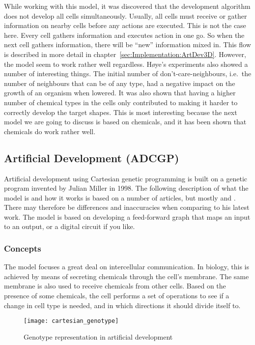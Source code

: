 While working with this model, it was discovered that the development algorithm does not develop all cells simultaneously. Usually, all cells must receive or gather information on nearby cells before any actions are executed. This is not the case here. Every cell gathers information and executes action in one go. So when the next cell gathers information, there will be ``new'' information mixed in. This flow is described in more detail in chapter~\ref{sec:Implementation:ArtDev3D}. However, the model seem to work rather well regardless. H{\o}ye's experiments also showed a number of interesting things. The initial number of don't-care-neighbours, i.e.\ the number of neighbours that can be of any type, had a negative impact on the growth of an organism when lowered. It was also shown that having a higher number of chemical types in the cells only contributed to making it harder to correctly develop the target shapes. This is most interesting because the next model we are going to discuss is based on chemicals, and it has been shown that chemicals do work rather well.


\subsection{Artificial Development (ADCGP)}
Artificial development using Cartesian genetic programming is built on a genetic program invented by Julian Miller in 1998. The following description of what the model is and how it works is based on a number of articles, but mostly \cite{mteurogp2000} and \cite{ecal2003}. There may therefore be differences and inaccuracies when comparing to his latest work. The model is based on developing a feed-forward graph that maps an input to an output, or a digital circuit if you like.

\subsubsection{Concepts}
The model focuses a great deal on intercellular communication. In biology, this is achieved by means of secreting chemicals through the cell's membrane. The same membrane is also used to receive chemicals from other cells. Based on the presence of some chemicals, the cell performs a set of operations to see if a change in cell type is needed, and in which directions it should divide itself to.

\begin{figure}[!ht]
	\centering
	\texttt{[image: cartesian\_genotype]}
	\caption{Genotype representation in artificial development}
	\label{fig:cartesian_genotype}
\end{figure}

